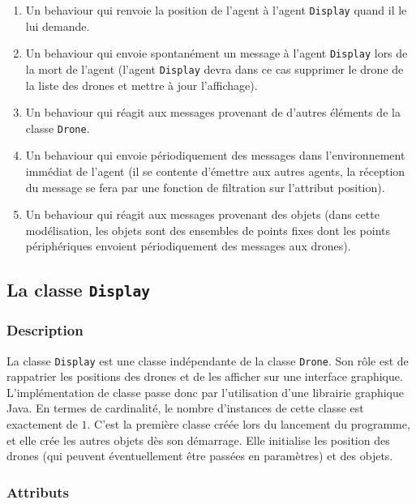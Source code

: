 \documentclass[11pt]{report}
\begin{document}
\begin{enumerate}
\item Un behaviour qui renvoie la position de l'agent à l'agent \verb|Display| quand il le lui demande.

\item Un behaviour qui envoie spontanément un message à l'agent \verb|Display| lors de la mort de l'agent (l'agent \verb|Display| devra dans ce cas supprimer le drone de la liste des drones et mettre à jour l'affichage).

\item Un behaviour qui réagit aux messages provenant de d'autres éléments de la classe \verb|Drone|.

\item Un behaviour qui envoie périodiquement des messages dans l'environnement immédiat de l'agent (il se contente d'émettre aux autres agents, la réception du message se fera par une fonction de filtration sur l'attribut position).

\item Un behaviour qui réagit aux messages provenant des objets (dans cette modélisation, les objets sont des ensembles de points fixes dont les points périphériques envoient périodiquement des messages aux drones).
\end{enumerate}

\newpage
\subsection{La classe \protect\Verb+Display+}
\subsubsection{Description}

La classe \verb|Display| est une classe indépendante de la classe \verb|Drone|. Son rôle est de rappatrier les positions des drones et de les afficher sur une interface graphique. L'implémentation de classe passe donc par l'utilisation d'une librairie graphique Java. En termes de cardinalité, le nombre d'instances de cette classe est exactement de $1$. C'est la première classe créée lors du lancement du programme, et elle crée les autres objets dès son démarrage. Elle initialise les position des drones (qui peuvent éventuellement être passées en paramètres) et des objets.

\subsubsection{Attributs}
\end{document}
